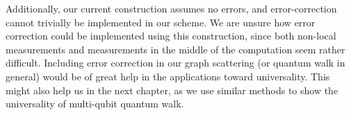 \documentclass[../thesis-main/thesis-main]{subfiles}
\begin{document}
Additionally, our current construction assumes no errors, and error-correction cannot trivially be implemented in our scheme.  We are unsure how error correction could be implemented using this construction, since both non-local measurements and measurements in the middle of the computation seem rather difficult.  Including error correction in our graph scattering (or quantum walk in general) would be of great help in the applications toward universality.  This might also help us in the next chapter, as we use similar methods to show the universality of multi-qubit quantum walk.


\biblio
\end{document}
